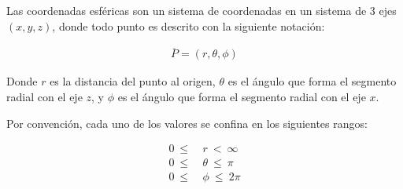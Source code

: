 Las coordenadas esféricas son un sistema de coordenadas en un sistema de 3 ejes ${\left(x,y,z\right)}$, donde todo punto es descrito con la siguiente notación:

\begin{eqnarray}
  \overline{P}=\left(r,\theta,\phi\right)
\end{eqnarray}

Donde ${r}$ es la distancia del punto al origen, ${\theta}$ es el ángulo que forma el segmento radial con el eje ${z}$, y ${\phi}$ es el ángulo que forma el segmento radial con el eje ${x}$.

Por convención, cada uno de los valores se confina en los siguientes rangos:

\begin{equation*}
  \begin{split}
    0\ \leq\ &r\ <\ \infty\\
    0\ \leq\ &\theta\ \leq\ \pi\\
    0\ \leq\ &\phi\ \leq\ 2\pi
  \end{split}
\end{equation*}
